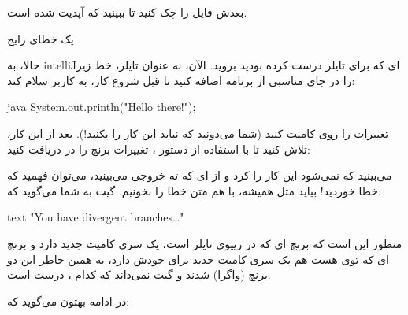 بعدش فایل  را چک کنید تا ببینید که آپدیت شده است.

یک خطای رایج

حالا، به intelliJای که برای تایلر درست کرده بودید بروید. الآن، به عنوان
تایلر، خط زیر را در جای مناسبی از برنامه‌ اضافه کنید تا قبل شروع کار، به
کاربر سلام کند:

\begin{codebox}{java}
System.out.println("Hello there!");
\end{codebox}

تغییرات را روی  کامیت کنید (شما می‌دونید که نباید این
کار را بکنید!). بعد از این کار، تلاش کنید تا با استفاده از دستور
، تغییرات برنچ  را در
 دریافت کنید:


می‌بینید که نمی‌شود این کار را کرد و از  ای که ته خروجی
می‌بینید، می‌توان فهمید که خطا خوردید! بیاید مثل همیشه، با هم متن خطا را
بخونیم. گیت به شما می‌گوید که:

\begin{codebox}{text}
"You have divergent branches…"
\end{codebox}

منظور این است که برنچ  ای که در ریپوی
 تایلر است، یک سری کامیت جدید دارد و برنچ
 ای که توی  هست هم یک سری کامیت
جدید برای خودش دارد، به همین خاطر این دو برنچ  (واگرا)
شدند و گیت نمی‌داند که کدام  ، درست است.

در ادامه بهتون می‌گوید که:

